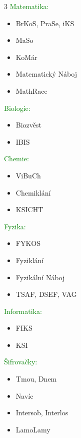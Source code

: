\documentclass[a5paper, twoside]{article}
\begin{document}
\begin{multicols}{3}
	\footnotesize
	\noindent\textcolor{green}{Matematika:}
	\vspace{-1em}
	\begin{itemize}[leftmargin=10pt]
		\item BrKoS, PraSe, iKS
		\item MaSo
		\item KoMár
		\item Matematický Náboj
		\item MathRace
	\end{itemize}
	\textcolor{green}{Biologie:}
	\vspace{-1em}
	\begin{itemize}[leftmargin=10pt]
		\item Biozvěst
		\item IBIS
	\end{itemize}
	\textcolor{green}{Chemie:}
	\vspace{-1em}
	\begin{itemize}[leftmargin=10pt]
		\item ViBuCh
		\item Chemiklání
		\item KSICHT
	\end{itemize}
	\textcolor{green}{Fyzika:}
	\vspace{-1em}
	\begin{itemize}[leftmargin=10pt]
		\item FYKOS
		\item Fyziklání
		\item Fyzikální Náboj
		\item TSAF, DSEF, VAG
	\end{itemize}
	\vfill\null\columnbreak
	\textcolor{green}{Informatika:}
	\vspace{-1em}
	\begin{itemize}[leftmargin=10pt]
		\item FIKS
		\item KSI
	\end{itemize}
	\textcolor{green}{Šifrovačky:}
	\vspace{-1em}
	\begin{itemize}[leftmargin=10pt]
		\item Tmou, Dnem
		\item Navíc
		\item Intersob, Interlos
		\item LamoLamy
	\end{itemize}
	\vspace*{1em}
\end{multicols}
\end{document}
